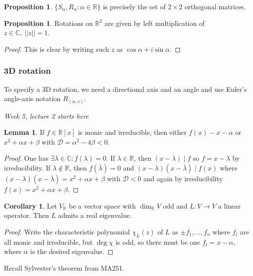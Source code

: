 \documentclass[a4paper]{article}
\newcommand{\R}{\mathbb{R}}
\newcommand{\C}{\mathbb{C}}
\theoremstyle{definition}
\newtheorem{prop}[defn]{Proposition}
\newtheorem{lemma}[defn]{Lemma}
\newtheorem{coro}[defn]{Corollary}
\begin{document}
\begin{prop}
$\{S_\alpha,R_\alpha:\alpha\in\R\}$ is precisely the set of $2\times 2$ orthogonal matrices.
\end{prop}

\begin{prop}
Rotations on $\R^2$ are given by left multiplication of $z\in\C,\ ||z||=1$.
\end{prop}
\begin{proof}
This is clear by writing such $z$ as $\cos\alpha+i\sin\alpha$.
\end{proof}

\subsubsection{3D rotation}
To specify a 3D rotation, we need a directional axis and an angle and use Euler's angle-axis notation $R_{(\alpha,v)}$.

\begin{flushright}
\textit{Week 5, lecture 2 starts here}
\end{flushright}

\begin{lemma}
\label{lemma:formsofmonicirred}
If $f\in\R[x]$ is monic and irreducible, then either $f(x)-x-\alpha$ or $x^2+\alpha x+\beta$ with $\mathcal D=\alpha^2-4\beta<0$.
\end{lemma}
\begin{proof}
One has $\exists\lambda\in\C:f(\lambda)=0$. If $\lambda\in\R$, then $(x-\lambda)\mid f$ so $f=x-\lambda$ by irreducibility. If $\lambda\notin\R$, then $f(\overline\lambda)=0$ and $(x-\lambda)(x-\overline\lambda)\mid f(x)$ where $(x-\lambda)(x-\overline\lambda)=x^2+\alpha x+\beta$ with $\mathcal D<0$ and again by irreducibility $f(x)=x^2+\alpha x+\beta$.
\end{proof}

\begin{coro}
Let $V_\R$ be a vector space with $\dim_\R V$ odd and $L:V\rightarrow V$ a linear operator. Then $L$ admits a real eigenvalue.
\end{coro}
\begin{proof}
Write the characteristic polynomial $\chi_L(z)$ of $L$ as $\pm f_1,\ldots,f_n$ where $f_i$ are all monic and irreducible, but $\deg\chi$ is odd, so there must be one $f_i=x-\alpha$, where $\alpha$ is the desired eigenvalue.
\end{proof}

Recall Sylvester's theorem from MA251.
\end{document}
